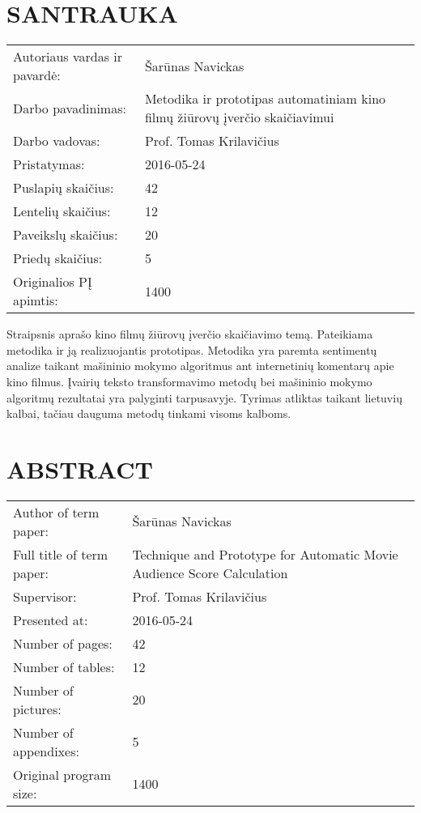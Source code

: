\chapter*{SANTRAUKA}

\begin{tabular}{p{6cm} p{10cm}}
Autoriaus vardas ir pavardė:  & Šarūnas Navickas\\
Darbo pavadinimas:	          & Metodika ir prototipas automatiniam kino filmų žiūrovų įverčio skaičiavimui\\
Darbo vadovas:		            & Prof. Tomas Krilavičius\\
Pristatymas:				          & 2016-05-24\\
Puslapių skaičius:			      & 42\\
Lentelių skaičius:			      & 12\\
Paveikslų skaičius:			      & 20\\
Priedų skaičius: 			        & 5\\
Originalios PĮ apimtis:		    & 1400\\
\end{tabular}

\vspace{1.5cm}

Straipsnis aprašo kino filmų žiūrovų įverčio skaičiavimo temą.
Pateikiama metodika ir ją realizuojantis prototipas.
Metodika yra paremta sentimentų analize taikant mašininio mokymo algoritmus
ant internetinių komentarų apie kino filmus.
Įvairių teksto transformavimo metodų bei mašininio mokymo algoritmų rezultatai yra palyginti tarpusavyje.
Tyrimas atliktas taikant lietuvių kalbai, tačiau dauguma metodų tinkami visoms kalboms.

\newpage

\chapter*{ABSTRACT}

\begin{tabular}{p{6cm} p{10cm}}
Author of term paper: 		& Šarūnas Navickas\\
Full title of term paper:	& Technique and Prototype for Automatic Movie Audience Score Calculation\\
Supervisor:					      & Prof. Tomas Krilavičius\\
Presented at:				      & 2016-05-24\\
Number of pages:			    & 42\\
Number of tables:			    & 12\\
Number of pictures:			  & 20\\
Number of appendixes:		  & 5\\
Original program size:    & 1400\\
\end{tabular}

